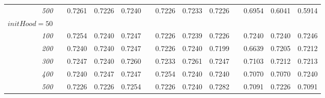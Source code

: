\documentclass[a4paper, 10pt]{article}
\begin{document}
\begin{figure}[h]
\begin{tabular}{@{}rcrrrcrrrcrrr@{}}
      \emph{500}  &&  0.7261  &  0.7226  &  0.7240  &&  0.7226  &  0.7233  &  0.7226  &&  0.6954  &  0.6041  &  0.5914 \\
      $initHood = 50$ \\
      \emph{100}  &&  0.7254  &  0.7240  &  0.7247  &&  0.7226  &  0.7239  &  0.7226  &&  0.7240  &  0.7240  &  0.7246 \\
      \emph{200}  &&  0.7240  &  0.7240  &  0.7247  &&  0.7226  &  0.7240  &  0.7199  &&  0.6639  &  0.7205  &  0.7212 \\
      \emph{300}  &&  0.7247  &  0.7240  &  0.7260  &&  0.7233  &  0.7261  &  0.7247  &&  0.7103  &  0.7212  &  0.7213 \\
      \emph{400}  &&  0.7240  &  0.7247  &  0.7247  &&  0.7254  &  0.7240  &  0.7240  &&  0.7070  &  0.7070  &  0.7240 \\
      \emph{500}  &&  0.7226  &  0.7226  &  0.7254  &&  0.7226  &  0.7240  &  0.7282  &&  0.7091  &  0.7226  &  0.7091 \\
%
%
%
%
         \bottomrule
      \end{tabular} 
      \caption{}
      \label{fig:bayes}
    \end{figure}




    
    
    
    
    
    
    
    
    
\end{document}
